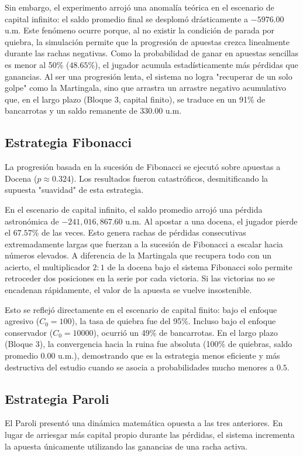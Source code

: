 \documentclass{article}
\begin{document}
Sin embargo, el experimento arrojó una anomalía teórica en el escenario de capital infinito: el saldo promedio final se desplomó drásticamente a $-5976.00$ u.m. Este fenómeno ocurre porque, al no existir la condición de parada por quiebra, la simulación permite que la progresión de apuestas crezca linealmente durante las rachas negativas. Como la probabilidad de ganar en apuestas sencillas es menor al 50\% ($48.65\%$), el jugador acumula estadísticamente más pérdidas que ganancias. Al ser una progresión lenta, el sistema no logra "recuperar de un solo golpe" como la Martingala, sino que arrastra un arrastre negativo acumulativo que, en el largo plazo (Bloque 3, capital finito), se traduce en un 91\% de bancarrotas y un saldo remanente de $330.00$ u.m.

\subsection{Estrategia Fibonacci}
La progresión basada en la sucesión de Fibonacci se ejecutó sobre apuestas a Docena ($p \approx 0.324$). Los resultados fueron catastróficos, desmitificando la supuesta "suavidad" de esta estrategia.

En el escenario de capital infinito, el saldo promedio arrojó una pérdida astronómica de $-241,016,867.60$ u.m. Al apostar a una docena, el jugador pierde el $67.57\%$ de las veces. Esto genera rachas de pérdidas consecutivas extremadamente largas que fuerzan a la sucesión de Fibonacci a escalar hacia números elevados. A diferencia de la Martingala que recupera todo con un acierto, el multiplicador $2:1$ de la docena bajo el sistema Fibonacci solo permite retroceder dos posiciones en la serie por cada victoria. Si las victorias no se encadenan rápidamente, el valor de la apuesta se vuelve insostenible. 

Esto se reflejó directamente en el escenario de capital finito: bajo el enfoque agresivo ($C_0 = 100$), la tasa de quiebra fue del 95\%. Incluso bajo el enfoque conservador ($C_0 = 10000$), ocurrió un 49\% de bancarrotas. En el largo plazo (Bloque 3), la convergencia hacia la ruina fue absoluta (100\% de quiebras, saldo promedio $0.00$ u.m.), demostrando que es la estrategia menos eficiente y más destructiva del estudio cuando se asocia a probabilidades mucho menores a $0.5$.

\subsection{Estrategia Paroli}
El Paroli presentó una dinámica matemática opuesta a las tres anteriores. En lugar de arriesgar más capital propio durante las pérdidas, el sistema incrementa la apuesta únicamente utilizando las ganancias de una racha activa. 
\end{document}
